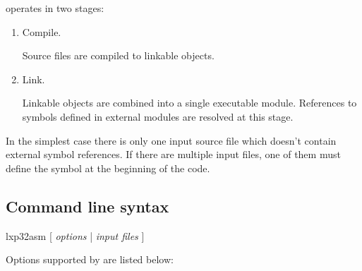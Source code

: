 \documentclass[a4paper,12pt,twoside,extrafontsizes]{memoir}
\begin{document}
 operates in two stages:

\begin{enumerate}
	\item Compile.
	
	Source files are compiled to linkable objects.
	
	\item Link.
	
	Linkable objects are combined into a single executable module. References to symbols defined in external modules are resolved at this stage.
\end{enumerate}

In the simplest case there is only one input source file which doesn't contain external symbol references. If there are multiple input files, one of them must define the  symbol at the beginning of the code.

\subsection{Command line syntax}

\begin{codepar}
    lxp32asm [ \emph{options} | \emph{input files} ]
\end{codepar}

Options supported by  are listed below:
\end{document}
